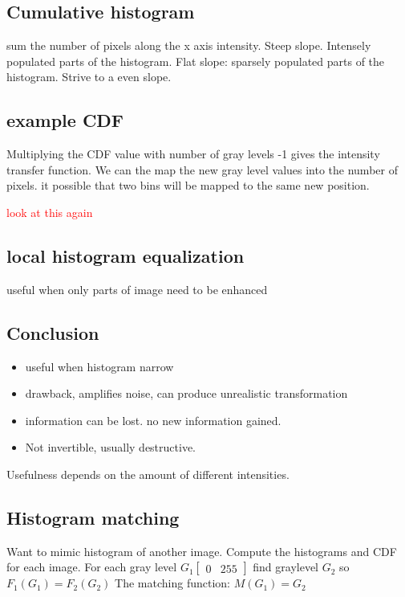 \documentclass[a4paper]{article}
\begin{document}
\subsection{Cumulative histogram}
sum the number of pixels along the x axis intensity.
Steep slope. Intensely populated parts of the histogram. Flat slope: sparsely populated parts of the histogram. Strive to a even slope. 

\subsection{example CDF}
Multiplying the CDF value with  number of gray levels -1 gives the intensity transfer function. We can the map the new gray level values into the number of pixels. it possible that two bins will be mapped to the same new position. 

\textcolor{red}{look at this again}

\subsection{local histogram equalization}
useful when only parts of image need to be enhanced 

\subsection{Conclusion}
\begin{itemize}
    \item useful when histogram narrow
    \item drawback, amplifies noise, can produce unrealistic transformation
    \item information can be lost. no new information gained. 
    \item Not invertible, usually destructive. 
\end{itemize}

Usefulness depends on the amount of different intensities. 

\subsection{Histogram matching}
Want to mimic histogram of another image. Compute the histograms and CDF for each image. For each gray level $G_1 \begin{bmatrix} 0& 255 \end{bmatrix}$ find graylevel $G_2$ so $F_1(G_1) = F_2(G_2)$
The matching function: $M(G_1) = G_2$
\end{document}
